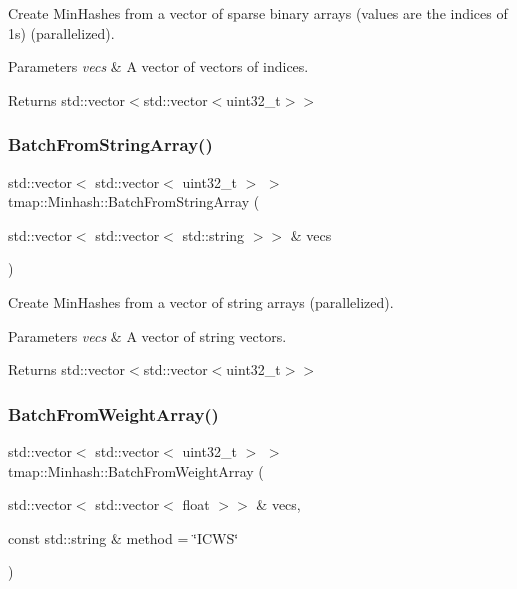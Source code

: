 Create Min\+Hashes from a vector of sparse binary arrays (values are the indices of 1s) (parallelized). 


\begin{DoxyParams}{Parameters}
{\em vecs} & A vector of vectors of indices. \\
\hline
\end{DoxyParams}
\begin{DoxyReturn}{Returns}
std\+::vector$<$std\+::vector$<$uint32\+\_\+t$>$$>$ 
\end{DoxyReturn}
\mbox{\label{classtmap_1_1Minhash_a9382e443b9f622c4564449373051d006}} 
\subsubsection{\texorpdfstring{Batch\+From\+String\+Array()}{BatchFromStringArray()}}
{\footnotesize\ttfamily std\+::vector$<$ std\+::vector$<$ uint32\+\_\+t $>$ $>$ tmap\+::\+Minhash\+::\+Batch\+From\+String\+Array (\begin{DoxyParamCaption}\item[{std\+::vector$<$ std\+::vector$<$ std\+::string $>$$>$ \&}]{vecs }\end{DoxyParamCaption})}



Create Min\+Hashes from a vector of string arrays (parallelized). 


\begin{DoxyParams}{Parameters}
{\em vecs} & A vector of string vectors. \\
\hline
\end{DoxyParams}
\begin{DoxyReturn}{Returns}
std\+::vector$<$std\+::vector$<$uint32\+\_\+t$>$$>$ 
\end{DoxyReturn}
\mbox{\label{classtmap_1_1Minhash_a8fe5c588003e8a3089d0a04df7b0f6e9}} 
\subsubsection{\texorpdfstring{Batch\+From\+Weight\+Array()}{BatchFromWeightArray()}}
{\footnotesize\ttfamily std\+::vector$<$ std\+::vector$<$ uint32\+\_\+t $>$ $>$ tmap\+::\+Minhash\+::\+Batch\+From\+Weight\+Array (\begin{DoxyParamCaption}\item[{std\+::vector$<$ std\+::vector$<$ float $>$$>$ \&}]{vecs,  }\item[{const std\+::string \&}]{method = {\ttfamily \char`\"{}ICWS\char`\"{}} }\end{DoxyParamCaption})}



